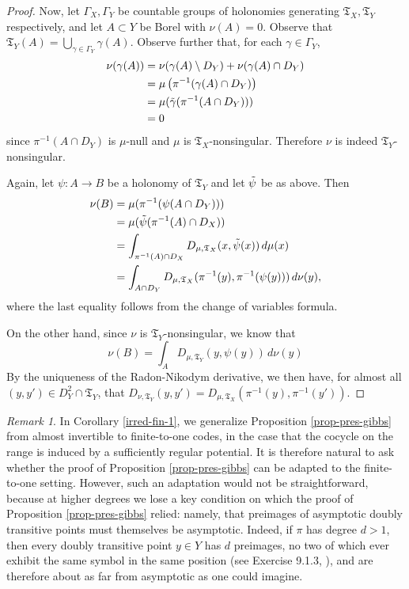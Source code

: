 \documentclass{amsproc}
\numberwithin{theorem}{section}
\theoremstyle{remark}
\newtheorem*{remark}{Remark}
\theoremstyle{definition}
\newcommand{\fT}{\mathfrak{T}}
\theoremstyle{plain}
\begin{document}
\begin{proof}
Now, let $\Gamma_X, \Gamma_Y$ be countable groups of holonomies generating $\fT_X, \fT_Y$ respectively, and let $A \subset Y$ be Borel with $\nu(A) = 0$. Observe that $\fT_Y(A) = \bigcup_{\gamma \in \Gamma_Y} \gamma(A)$. Observe further that, for each $\gamma \in \Gamma_Y$,
\begin{align*}
    \nu(\gamma(A)) &= \nu( \gamma(A) \setminus D_Y) + \nu( \gamma(A) \cap D_Y   ) \\
    &= \mu\left(\pi^{-1}(\gamma(A) \cap D_Y)\right)\\
    &= \mu( \Tilde{\gamma} (\pi^{-1}(A \cap D_Y))          ) \\
    &= 0
\end{align*}
since $\pi^{-1}(A \cap D_Y)$ is $\mu$-null and $\mu$ is $\fT_X$-nonsingular. Therefore $\nu$ is indeed $\fT_Y$-nonsingular.

Again, let $\psi: A \to B$ be a holonomy of $\fT_Y$ and let $\Tilde{\psi}$ be as above. Then
\begin{align*}
    \nu(B) &= \mu( \pi^{-1}(\psi(A \cap D_Y))     )     \\
    &= \mu(  \Tilde{\psi}(\pi^{-1} (A) \cap D_X )     ) \\
    &= \int_{\pi^{-1} (A) \cap D_X} D_{\mu, \fT_X}( x, \Tilde{\psi}(x)   ) \, d\mu(x) \\
    &= \int_{A \cap D_Y} D_{\mu, \fT_X}( \pi^{-1}(y), \pi^{-1}(\psi(y))  ) \, d\nu(y),
\end{align*}
where the last equality follows from the change of variables formula.

On the other hand, since $\nu$ is $\fT_Y$-nonsingular, we know that
\[
\nu(B) = \int_A D_{\mu, \fT_Y}( y, \psi(y)  ) \, d\nu(y)
\]
By the uniqueness of the Radon-Nikodym derivative, we then have, for almost all $(y,y') \in D_Y^2 \cap \fT_Y$, that $D_{\nu, \fT_Y}(y,y') = D_{\mu, \fT_X}( \pi^{-1}(y), \pi^{-1}(y')  )$. 
\end{proof}

\begin{remark}
In Corollary \ref{irred-fin-1}, we generalize Proposition \ref{prop-pres-gibbs} from almost invertible to finite-to-one codes, in the case that the cocycle on the range is induced by a sufficiently regular potential. It is therefore natural to ask whether the proof of Proposition \ref{prop-pres-gibbs} can be adapted to the finite-to-one setting. However, such an adaptation would not be straightforward, because at higher degrees we lose a key condition on which the proof of Proposition \ref{prop-pres-gibbs} relied: namely, that preimages of asymptotic doubly transitive points must themselves be asymptotic. Indeed, if $\pi$ has degree $d > 1$, then every doubly transitive point $y \in Y$ has $d$ preimages, no two of which ever exhibit the same symbol in the same position (see Exercise 9.1.3, \cite{lind1995introduction}), and are therefore about as far from asymptotic as one could imagine.
\end{remark}
\end{document}
